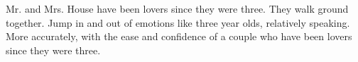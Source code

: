 

Mr. and Mrs. House have been lovers since they were three.  They walk
ground together.  Jump in and out of emotions like three year olds,
relatively speaking.  More accurately, with the ease and confidence of
a couple who have been lovers since they were three.  

\bye
